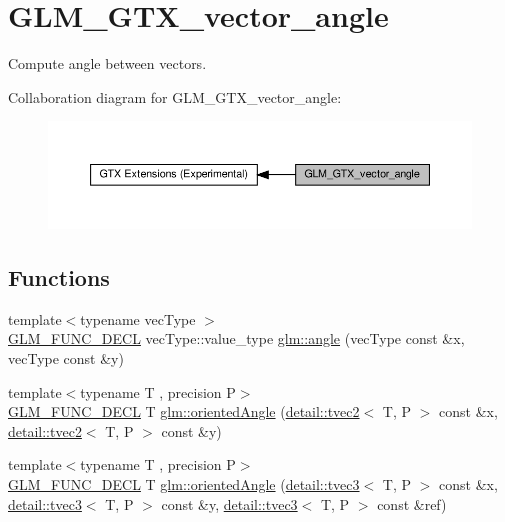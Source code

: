 \hypertarget{group__gtx__vector__angle}{}\section{G\+L\+M\+\_\+\+G\+T\+X\+\_\+vector\+\_\+angle}
\label{group__gtx__vector__angle}


Compute angle between vectors.  


Collaboration diagram for G\+L\+M\+\_\+\+G\+T\+X\+\_\+vector\+\_\+angle\+:\nopagebreak
\begin{figure}[H]
\begin{center}
\leavevmode
\includegraphics[width=350pt]{group__gtx__vector__angle}
\end{center}
\end{figure}
\subsection*{Functions}
\begin{DoxyCompactItemize}
\item 
{\footnotesize template$<$typename vec\+Type $>$ }\\\hyperlink{setup_8hpp_ab2d052de21a70539923e9bcbf6e83a51}{G\+L\+M\+\_\+\+F\+U\+N\+C\+\_\+\+D\+E\+CL} vec\+Type\+::value\+\_\+type \hyperlink{group__gtx__vector__angle_gab8691008a2536b681b711211816c14f7}{glm\+::angle} (vec\+Type const \&x, vec\+Type const \&y)
\item 
{\footnotesize template$<$typename T , precision P$>$ }\\\hyperlink{setup_8hpp_ab2d052de21a70539923e9bcbf6e83a51}{G\+L\+M\+\_\+\+F\+U\+N\+C\+\_\+\+D\+E\+CL} T \hyperlink{group__gtx__vector__angle_ga6f9cbae1b02b49ad92a1d0070649f038}{glm\+::oriented\+Angle} (\hyperlink{structglm_1_1detail_1_1tvec2}{detail\+::tvec2}$<$ T, P $>$ const \&x, \hyperlink{structglm_1_1detail_1_1tvec2}{detail\+::tvec2}$<$ T, P $>$ const \&y)
\item 
{\footnotesize template$<$typename T , precision P$>$ }\\\hyperlink{setup_8hpp_ab2d052de21a70539923e9bcbf6e83a51}{G\+L\+M\+\_\+\+F\+U\+N\+C\+\_\+\+D\+E\+CL} T \hyperlink{group__gtx__vector__angle_ga2aefc221dd5ed9fdacc17c28eea76775}{glm\+::oriented\+Angle} (\hyperlink{structglm_1_1detail_1_1tvec3}{detail\+::tvec3}$<$ T, P $>$ const \&x, \hyperlink{structglm_1_1detail_1_1tvec3}{detail\+::tvec3}$<$ T, P $>$ const \&y, \hyperlink{structglm_1_1detail_1_1tvec3}{detail\+::tvec3}$<$ T, P $>$ const \&ref)
\end{DoxyCompactItemize}


